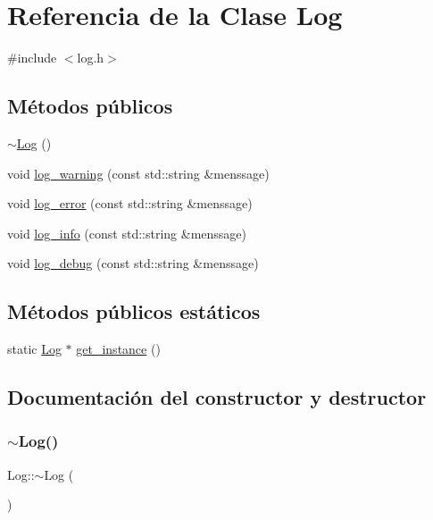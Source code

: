 \hypertarget{classLog}{}\section{Referencia de la Clase Log}
\label{classLog}


{\ttfamily \#include $<$log.\+h$>$}

\subsection*{Métodos públicos}
\begin{DoxyCompactItemize}
\item 
\hyperlink{classLog_a0fbfda88fbee5027c89f6eb121059360}{$\sim$\+Log} ()
\item 
void \hyperlink{classLog_ac659fa24adce6d3ed79be5c6ab4248ca}{log\+\_\+warning} (const std\+::string \&menssage)
\item 
void \hyperlink{classLog_a336032c9a87f2a6b0a463db7e2f7d1a4}{log\+\_\+error} (const std\+::string \&menssage)
\item 
void \hyperlink{classLog_a9af02d242cf75e658899c67ad9136fd7}{log\+\_\+info} (const std\+::string \&menssage)
\item 
void \hyperlink{classLog_a7ed913c04040b6ff20da0bd7306b92cd}{log\+\_\+debug} (const std\+::string \&menssage)
\end{DoxyCompactItemize}
\subsection*{Métodos públicos estáticos}
\begin{DoxyCompactItemize}
\item 
static \hyperlink{classLog}{Log} $\ast$ \hyperlink{classLog_a5046d929af7ff9a206279f2cd9e9d8e8}{get\+\_\+instance} ()
\end{DoxyCompactItemize}


\subsection{Documentación del constructor y destructor}
\mbox{\label{classLog_a0fbfda88fbee5027c89f6eb121059360}} 
\subsubsection{\texorpdfstring{$\sim$\+Log()}{~Log()}}
{\footnotesize\ttfamily Log\+::$\sim$\+Log (\begin{DoxyParamCaption}{ }\end{DoxyParamCaption})}



